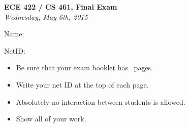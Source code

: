 \documentclass[addpoints,answers]{exam}
\begin{document}
\begin{titlepage}
  \vspace*{\fill}
  \begin{center}
    \Large\textbf{ECE 422 / CS 461, Final Exam}\\
    \large\textit{Wednesday, May 6th, 2015}\\
  \end{center}
  \vspace{.5in}
  \par\large{Name:}\hrulefill\\
  \par\large{NetID:}\hrulefill\\
  \vspace{.5in}
  \begin{itemize}
  \item Be sure that your exam booklet has \numpages\ pages.
  \item Write your net ID at the top of each page.
  \item Absolutely no interaction between students is allowed.
  \item Show all of your work.
  \end{itemize}
  \vspace*{\fill}
\end{titlepage}
\newpage 

\begin{center}
  \gradetable[v][pages]
\end{center}
\newpage
\end{document}
